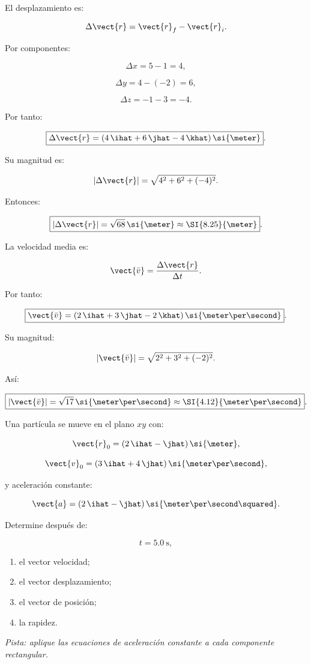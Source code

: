 \begin{explicacion}
El desplazamiento es:

\[
\Delta\vect{r}
=
\vect{r}_f-\vect{r}_i.
\]

Por componentes:

\[
\Delta x=5-1=4,
\]

\[
\Delta y=4-(-2)=6,
\]

\[
\Delta z=-1-3=-4.
\]

Por tanto:

\[
\boxed{
\Delta\vect{r}
=
(4\,\ihat+6\,\jhat-4\,\khat)\,\si{\meter}
}.
\]

Su magnitud es:

\[
|\Delta\vect{r}|
=
\sqrt{4^2+6^2+(-4)^2}.
\]

Entonces:

\[
\boxed{
|\Delta\vect{r}|
=
\sqrt{68}\,\si{\meter}
\approx
\SI{8.25}{\meter}
}.
\]

La velocidad media es:

\[
\vect{\bar{v}}
=
\frac{\Delta\vect{r}}{\Delta t}.
\]

Por tanto:

\[
\boxed{
\vect{\bar{v}}
=
(2\,\ihat+3\,\jhat-2\,\khat)
\,\si{\meter\per\second}
}.
\]

Su magnitud:

\[
|\vect{\bar{v}}|
=
\sqrt{2^2+3^2+(-2)^2}.
\]

Así:

\[
\boxed{
|\vect{\bar{v}}|
=
\sqrt{17}\,\si{\meter\per\second}
\approx
\SI{4.12}{\meter\per\second}
}.
\]
\end{explicacion}


\nivelintermedio


\begin{ejercicio}
Una partícula se mueve en el plano \(xy\) con:

\[
\vect{r}_0
=
(2\,\ihat-\jhat)\,\si{\meter},
\]

\[
\vect{v}_0
=
(3\,\ihat+4\,\jhat)\,
\si{\meter\per\second},
\]

y aceleración constante:

\[
\vect{a}
=
(2\,\ihat-\jhat)\,
\si{\meter\per\second\squared}.
\]

Determine después de:

\[
t=\SI{5.0}{\second},
\]

\begin{enumerate}[label=\alph*)]
    \item el vector velocidad;
    \item el vector desplazamiento;
    \item el vector de posición;
    \item la rapidez.
\end{enumerate}

\textit{Pista: aplique las ecuaciones de aceleración constante a cada componente rectangular.}
\end{ejercicio}

